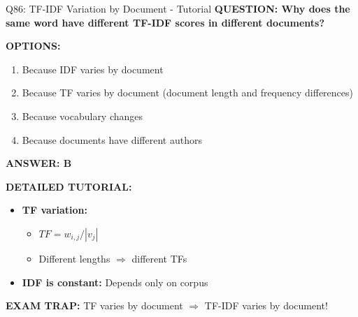 \documentclass[8pt]{beamer}
\begin{document}
	\begin{frame}{Q86: TF-IDF Variation by Document - Tutorial}
		\fontsize{6.5}{7.5}\selectfont
		\textbf{QUESTION: Why does the same word have different TF-IDF scores in different documents?}
		
		\vspace{0.1cm}
		\textbf{OPTIONS:}
		\begin{enumerate}
			\item Because IDF varies by document
			\item Because TF varies by document (document length and frequency differences)
			\item Because vocabulary changes
			\item Because documents have different authors
		\end{enumerate}
		
		\vspace{0.1cm}
		\textcolor{myblue}{\textbf{ANSWER: B}}
		
		\vspace{0.1cm}
		\textbf{DETAILED TUTORIAL:}
		\begin{itemize}
			\item \textbf{TF variation:}
			\begin{itemize}
				\item $TF = w_{i,j} / |v_j|$
				\item Different lengths $\Rightarrow$ different TFs
			\end{itemize}
			\item \textbf{IDF is constant:} Depends only on corpus
		\end{itemize}
		
		\textcolor{myred}{\textbf{EXAM TRAP:}} TF varies by document $\Rightarrow$ \textcolor{myblue}{TF-IDF varies by document}!
	\end{frame}
	
\end{document}
